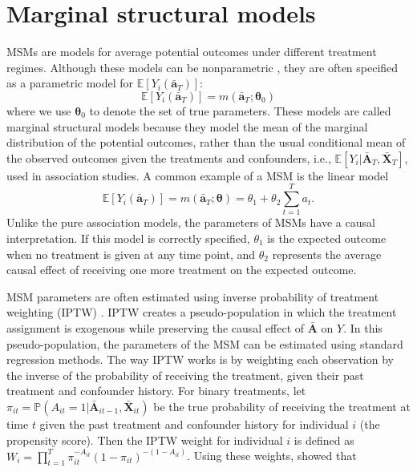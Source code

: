 \section{Marginal structural models}
MSMs are models for average potential outcomes under different treatment regimes. 
Although these models can 
be nonparametric \cite{neugebauerNonparametricCausalEffects2007}, they are often specified as a 
parametric model for $\mathbb{E}[Y_i(\bar{\mathbf{a}}_T)]$:
$$\mathbb{E}[Y_i(\bar{\mathbf{a}}_T)] = m(\bar{\mathbf{a}}_T; \boldsymbol{\theta}_0)$$
where we use $\boldsymbol{\theta}_0$ to denote the set of true parameters. These models are called marginal 
structural models because they model the mean of the marginal distribution of the potential outcomes, 
rather than the usual conditional mean of the observed outcomes given the treatments and 
confounders, i.e., $\mathbb{E}[Y_i|\bar{\mathbf{A}}_T, \bar{\mathbf{X}}_T]$, used in association studies. 
A common example of a MSM is 
the linear model $$\mathbb{E}[Y_i(\bar{\mathbf{a}}_T)] = m(\bar{\mathbf{a}}_T; \boldsymbol{\theta}) = \theta_1 + \theta_2 \sum_{t=1}^{T} a_t.$$ 
Unlike the pure association models, the parameters of MSMs have a causal interpretation. If this model is 
correctly specified,
$\theta_1$ is the expected outcome when no treatment is given at any time point, 
and $\theta_2$ represents the average causal effect of receiving one more treatment on the expected outcome.

MSM parameters are often estimated using inverse probability of treatment weighting (IPTW) 
\cite{robinsMarginalStructuralModels2000}. 
IPTW creates a pseudo-population in which the treatment assignment is exogenous 
while preserving the causal effect of $\bar{\mathbf{A}}$ on $Y$. 
In this pseudo-population, the parameters of the MSM can be estimated using standard regression methods. The 
way IPTW works is by weighting each observation by the inverse of the 
probability of receiving the treatment, 
given their past treatment and confounder history. For binary treatments, 
let $\pi_{it} = \mathbb{P}(A_{it} = 1 | \bar{\mathbf{A}}_{it-1}, \bar{\mathbf{X}}_{it})$ be 
the true probability of receiving the treatment at time $t$ given the past treatment  and confounder history for individual $i$ (the propensity score). 
Then the IPTW weight for individual $i$ is defined as 
$W_{i} = \prod_{t=1}^{T} \pi_{it}^{-A_{it}} (1-\pi_{it})^{-(1-A_{it})}$. Using 
these weights,  showed that 

